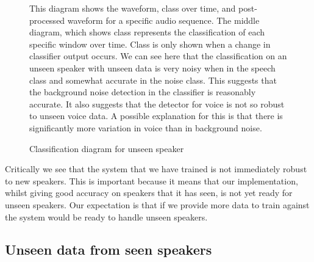 \documentclass[ %
                    author={Sam Phippen},
                supervisor={Dr. Rafal Bogacz},
                     title={Real time voice activity detectors in noisy personal computing environments},
                  subtitle={},
                    degree={MEng},
                      year={2012} ]{thesis}
\begin{document}
\begin{figure}

    \label{fig:waveform_unseen}

    This diagram shows the waveform, class over time, and post-processed
    waveform for a specific audio sequence. The middle diagram, which shows
    class represents the classification of each specific window over time.
    Class is only shown when a change in classifier output occurs. We can see
    here that the classification on an unseen speaker with unseen data is very
    noisy when in the speech class and somewhat accurate in the noise class.
    This suggests that the background noise detection in the classifier is
    reasonably accurate. It also suggests that the detector for voice is not so
    robust to unseen voice data. A possible explanation for this is that there
    is significantly more variation in voice than in background noise.

    \caption{Classification diagram for unseen speaker}

\end{figure}

Critically we see that the system that we have trained is not immediately
robust to new speakers. This is important because it means that our
implementation, whilst giving good accuracy on speakers that it has seen, is
not yet ready for unseen speakers. Our expectation is that if we provide more
data to train against the system would be ready to handle unseen speakers.

\subsection{Unseen data from seen speakers}
\end{document}
